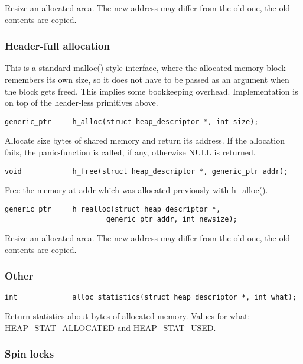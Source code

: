     Resize an allocated area. The new address may differ from the old one,
    the old contents are copied.


\subsubsection{Header-full allocation}
This is a standard malloc()-style interface, where the allocated memory
block remembers its own size, so it does not have to be passed as an
argument when the block gets freed. This implies some bookkeeping overhead.
Implementation is on top of the header-less primitives above.

\begin{verbatim}
generic_ptr     h_alloc(struct heap_descriptor *, int size);
\end{verbatim}

    Allocate size bytes of shared memory and return its address.
    If the allocation fails, the panic-function is called, if any,
    otherwise NULL is returned.

\begin{verbatim}
void            h_free(struct heap_descriptor *, generic_ptr addr);
\end{verbatim}

    Free the memory at addr which was allocated previously with h_alloc().

\begin{verbatim}
generic_ptr     h_realloc(struct heap_descriptor *,
                        generic_ptr addr, int newsize);
\end{verbatim}

    Resize an allocated area. The new address may differ from the old one,
    the old contents are copied.


\subsubsection{Other}

\begin{verbatim}
int             alloc_statistics(struct heap_descriptor *, int what);
\end{verbatim}

    Return statistics about bytes of allocated memory.
    Values for what: HEAP_STAT_ALLOCATED and HEAP_STAT_USED.


\subsubsection{Spin locks}

